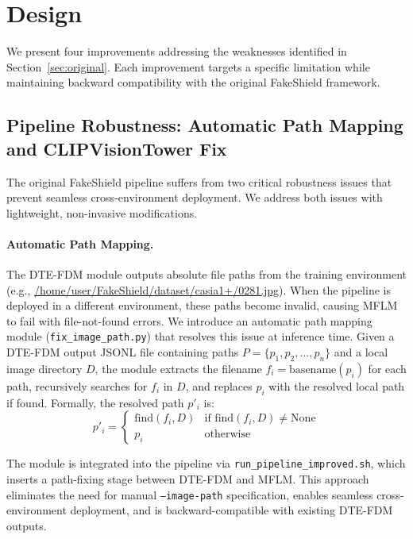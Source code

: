 \section{Design}
\label{sec:design}

We present four improvements addressing the weaknesses identified in Section~\ref{sec:original}. Each improvement targets a specific limitation while maintaining backward compatibility with the original FakeShield framework.

\subsection{Pipeline Robustness: Automatic Path Mapping and CLIPVisionTower Fix}

The original FakeShield pipeline suffers from two critical robustness issues that prevent seamless cross-environment deployment. We address both issues with lightweight, non-invasive modifications.

\paragraph{Automatic Path Mapping.} The DTE-FDM module outputs absolute file paths from the training environment (e.g., \url{/home/user/FakeShield/dataset/casia1+/0281.jpg}). When the pipeline is deployed in a different environment, these paths become invalid, causing MFLM to fail with file-not-found errors. We introduce an automatic path mapping module (\texttt{fix\_image\_path.py}) that resolves this issue at inference time. Given a DTE-FDM output JSONL file containing paths $P = \{p_1, p_2, \dots, p_n\}$ and a local image directory $D$, the module extracts the filename $f_i = \text{basename}(p_i)$ for each path, recursively searches for $f_i$ in $D$, and replaces $p_i$ with the resolved local path if found. Formally, the resolved path $p'_i$ is:
\begin{equation}
p'_i = \begin{cases}
    \text{find}(f_i, D) & \text{if } \text{find}(f_i, D) \neq \text{None} \\
    p_i & \text{otherwise}
\end{cases}
\end{equation}

The module is integrated into the pipeline via \texttt{run\_pipeline\_improved.sh}, which inserts a path-fixing stage between DTE-FDM and MFLM. This approach eliminates the need for manual \texttt{--image-path} specification, enables seamless cross-environment deployment, and is backward-compatible with existing DTE-FDM outputs.

